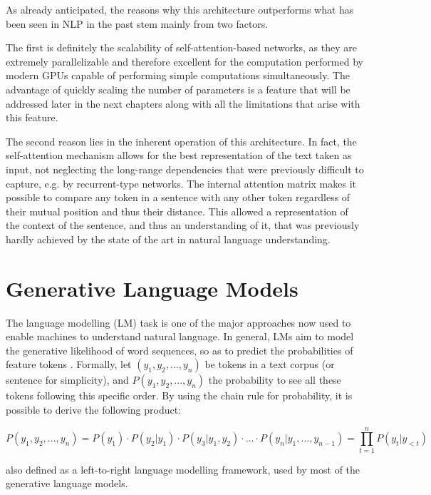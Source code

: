 As already anticipated, the reasons why this architecture outperforms what has been seen in NLP in the past stem mainly from two factors. 

The first is definitely the scalability of self-attention-based networks, as they are extremely parallelizable and therefore excellent for the computation performed by modern GPUs capable of performing simple computations simultaneously. The advantage of quickly scaling the number of parameters is a feature that will be addressed later in the next chapters along with all the limitations that arise with this feature. 

The second reason lies in the inherent operation of this architecture. In fact, the self-attention mechanism allows for the best representation of the text taken as input, not neglecting the long-range dependencies that were previously difficult to capture, e.g. by recurrent-type networks. The internal attention matrix makes it possible to compare any token in a sentence with any other token regardless of their mutual position and thus their distance. This allowed a representation of the context of the sentence, and thus an understanding of it, that was previously hardly achieved by the state of the art in natural language understanding.


\section {Generative Language Models} 

The language modelling (LM) task is one of the major approaches now used to enable machines to understand natural language. In general, LMs aim to model the generative likelihood of word sequences, so as to predict the probabilities of feature tokens \citep{zhao2023survey}. Formally, let $(y_1, y_2, ..., y_n)$ be tokens in a text corpus (or sentence for simplicity), and $P(y_1, y_2, ..., y_n)$ the probability to see all these tokens following this specific order. By using the chain rule for probability, it is possible to derive the following product:

\begin{equation*}
    P(y_1, y_2, ..., y_n) = P(y_1) \cdot P(y_2 | y_1) \cdot P(y_3 | y_1, y_2) \cdot ... \cdot P(y_n | y_1, ..., y_{n-1}) = \prod_{t = 1}^n P(y_t | y_{<t}) 
\end{equation*}

also defined as a left-to-right language modelling framework, used by most of the generative language models.

